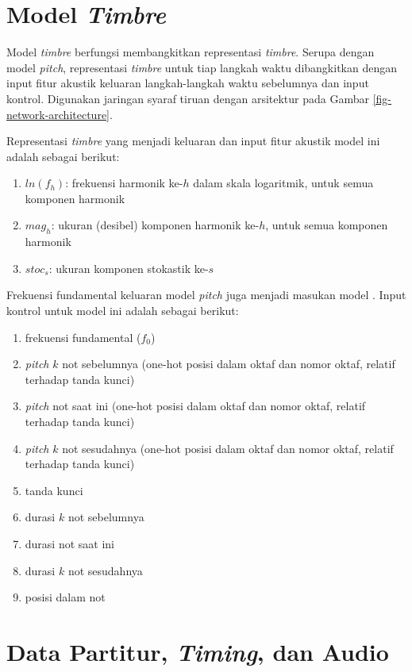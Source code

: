 \section{Model \textit{Timbre}}

Model \textit{timbre} berfungsi membangkitkan representasi \textit{timbre}. Serupa dengan model \textit{pitch}, representasi \textit{timbre} untuk tiap langkah waktu dibangkitkan dengan input fitur akustik keluaran langkah-langkah waktu sebelumnya dan input kontrol. Digunakan jaringan syaraf tiruan dengan arsitektur pada Gambar \ref{fig-network-architecture}.

Representasi \textit{timbre} yang menjadi keluaran dan input fitur akustik model ini adalah sebagai berikut:

\begin{enumerate}
    \item $ln(f_h)$: frekuensi harmonik ke-$h$ dalam skala logaritmik, untuk semua komponen harmonik
    \item $mag_h$: ukuran (desibel) komponen harmonik ke-$h$, untuk semua komponen harmonik
    \item $stoc_s$: ukuran komponen stokastik ke-$s$
\end{enumerate}

Frekuensi fundamental keluaran model \textit{pitch} juga menjadi masukan model . Input kontrol untuk model ini adalah sebagai berikut:
\begin{enumerate}
    \item frekuensi fundamental ($f_0$)
    \item \textit{pitch} $k$ not sebelumnya (one-hot posisi dalam oktaf dan nomor oktaf, relatif terhadap tanda kunci)
    \item \textit{pitch} not saat ini (one-hot posisi dalam oktaf dan nomor oktaf, relatif terhadap tanda kunci)
    \item \textit{pitch} $k$ not sesudahnya (one-hot posisi dalam oktaf dan nomor oktaf, relatif terhadap tanda kunci)
    \item tanda kunci
    \item durasi $k$ not sebelumnya
    \item durasi not saat ini
    \item durasi $k$ not sesudahnya
    \item posisi dalam not
\end{enumerate}

\section{Data Partitur, \textit{Timing}, dan Audio}

